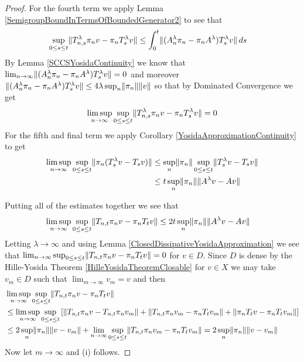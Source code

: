 \begin{proof}
For the fourth term we apply Lemma \ref{SemigroupBoundInTermsOfBoundedGenerator2} to see that 
\begin{align*}
\sup_{0 \leq s \leq t} \lVert T^\lambda_{n,s} \pi_n v - \pi_n T^\lambda_{s} v  \rVert 
&\leq \int_0^t \lVert (A^\lambda_n \pi_n - \pi_n A^\lambda) T^\lambda_s v \rVert \, ds
\end{align*}
By Lemma \ref{SCCSYosidaContinuity} we know that $\lim_{n \to \infty} \lVert (A^\lambda_n \pi_n - \pi_n A^\lambda) T^\lambda_s v \rVert = 0$ and moreover $\lVert (A^\lambda_n \pi_n - \pi_n A^\lambda) T^\lambda_s v \rVert \leq 4 \lambda \sup_n \lVert \pi_n \rVert \lVert v \rVert$ so that by Dominated Convergence we get  
\begin{align*}
\limsup_{n \to \infty} \sup_{0 \leq s \leq t} \lVert T^\lambda_{n,s} \pi_n v - \pi_n T^\lambda_{s} v  \rVert = 0
\end{align*}
For the fifth and final term we apply Corollary \ref{YosidaApproximationContinuity} to get
\begin{align*}
\limsup_{n \to \infty} \sup_{0 \leq s \leq t} \lVert \pi_n ( T^\lambda_{s} v - T_s v) \rVert &\leq \sup_{n} \lVert \pi_n \rVert \sup_{0 \leq s \leq t} \lVert T^\lambda_{s} v - T_s v \rVert \\
&\leq t \sup_{n} \lVert \pi_n \rVert \lVert A^\lambda v - A v \rVert
\end{align*}

Putting all of the estimates together we see that
\begin{align*}
\limsup_{n \to \infty} \sup_{0 \leq s \leq t} \lVert T_{n,t} \pi_n v - \pi_n T_t v \rVert  &\leq 2 t \sup_{n} \lVert \pi_n \rVert \lVert A^\lambda v - A v \rVert
\end{align*}
Letting $\lambda \to \infty$ and using Lemma \ref{ClosedDissipativeYosidaApproximation} we see that $\lim_{n \to \infty} \sup_{0 \leq s \leq t} \lVert T_{n,t} \pi_n v - \pi_n T_t v \rVert =0$ for 
$v \in D$.  Since $D$ is dense by the Hille-Yosida Theorem \ref{HilleYosidaTheoremClosable} for $v \in X$ we may take $v_m \in D$ such that $\lim_{m \to \infty} v_m = v$ and then
\begin{align*}
&\limsup_{n \to \infty} \sup_{0 \leq s \leq t} \lVert T_{n,t} \pi_n v - \pi_n T_t v \rVert \\
&\leq \limsup_{n \to \infty} \sup_{0 \leq s \leq t} \left[\lVert T_{n,t} \pi_n v- T_{n,t} \pi_n v_m \rVert + \lVert T_{n,t} \pi_n v_m - \pi_n T_t v_m \rVert + \lVert \pi_n T_t v - \pi_n T_t v_m \rVert  \right] \\
&\leq 2 \sup_n \lVert \pi_n \rVert \lVert v - v_m \rVert + \lim_{n \to \infty} \sup_{0 \leq s \leq t} \lVert T_{n,t} \pi_n v_m - \pi_n T_t v_m \rVert = 2 \sup_n \lVert \pi_n \rVert \lVert v - v_m \rVert 
\end{align*}
Now let $m \to \infty$ and (i) follows.
\end{proof}

